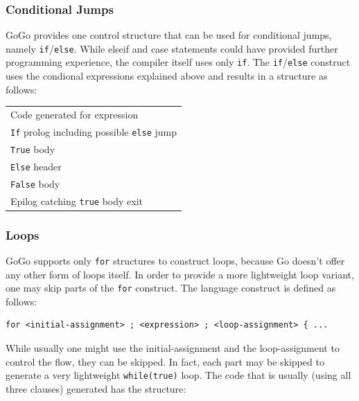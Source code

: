 \documentclass[a4paper]{scrartcl}
\let\subsection\subsubsection
\let\subsubsection\paragraph
\let\paragraph\subparagraph
\let\subparagraph\undefined
\begin{document}
    \subsection*{Conditional Jumps}
      GoGo provides one control structure that can be used for conditional jumps,
      namely \texttt{if}/\texttt{else}. While elseif and case statements could
      have provided further programming experience, the compiler itself uses only
      \texttt{if}. The \texttt{if}/\texttt{else} construct uses the condional
      expressions explained above and results in a structure as follows:
      \begin{table}[hbt]
        \centering
        \begin{tabular}{l}
          \toprule
          Code generated for expression\\
          \texttt{If} prolog including possible \texttt{else} jump\\
          \hspace{0.5cm} \texttt{True} body\\
          \texttt{Else} header\\
          \hspace{0.5cm} \texttt{False} body\\
          Epilog catching \texttt{true} body exit\\
          \bottomrule
        \end{tabular}
      \end{table}

    \subsection*{Loops}
      GoGo supports only \texttt{for} structures to construct loops, because
      Go doesn't offer any other form of loops itself. In order to provide a more 
      lightweight loop variant, one may skip parts of the \texttt{for} construct.
      The language construct is defined as follows:
      \begin{lstlisting}
for <initial-assignment> ; <expression> ; <loop-assignment> { ...
      \end{lstlisting}

      While usually one might use the initial-assignment and the loop-assignment
      to control the flow, they can be skipped. In fact, each part may be skipped
      to generate a very lightweight \texttt{while(true)} loop. The code that is
      usually (using all three clauses) generated has the structure:
\end{document}
